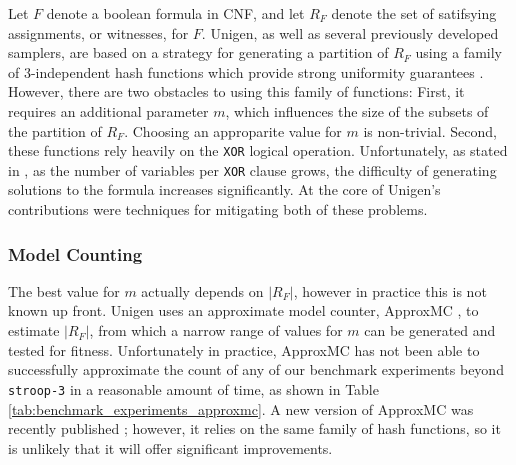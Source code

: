 Let $F$ denote a boolean formula in CNF, and let $R_F$ denote the set of satifsying assignments, or witnesses, for $F$. Unigen, as well as several previously developed samplers, are based on a strategy for generating a partition of $R_F$ using a family of 3-independent hash functions which provide strong uniformity guarantees \cite{gomes_near-uniform_2007}. However, there are two obstacles to using this family of functions: First, it requires an additional parameter $m$, which influences the size of the subsets of the partition of $R_F$. Choosing an approparite value for $m$ is non-trivial. Second, these functions rely heavily on the \texttt{XOR} logical operation. Unfortunately, as stated in \cite{chakraborty_balancing_2014}, as the number of variables per \texttt{XOR} clause grows, the difficulty of generating solutions to the formula increases significantly. \cite{Gomes:2007:SXM:1768142.1768155} At the core of Unigen's contributions were techniques for mitigating both of these problems.

\subsubsection{Model Counting}

The best value for $m$ actually depends on $|R_F|$, however in practice this is not known up front. Unigen uses an approximate model counter, ApproxMC \cite{DBLP:journals/corr/ChakrabortyMV13}, to estimate $|R_F|$, from which a narrow range of values for $m$ can be generated and tested for fitness. Unfortunately in practice, ApproxMC has not been able to successfully approximate the count of any of our benchmark experiments beyond \texttt{stroop-3} in a reasonable amount of time, as shown in Table \ref{tab:benchmark_experiments_approxmc}. A new version of ApproxMC was recently published \cite{approxmc_SM19}; however, it relies on the same family of hash functions, so it is unlikely that it will offer significant improvements.



